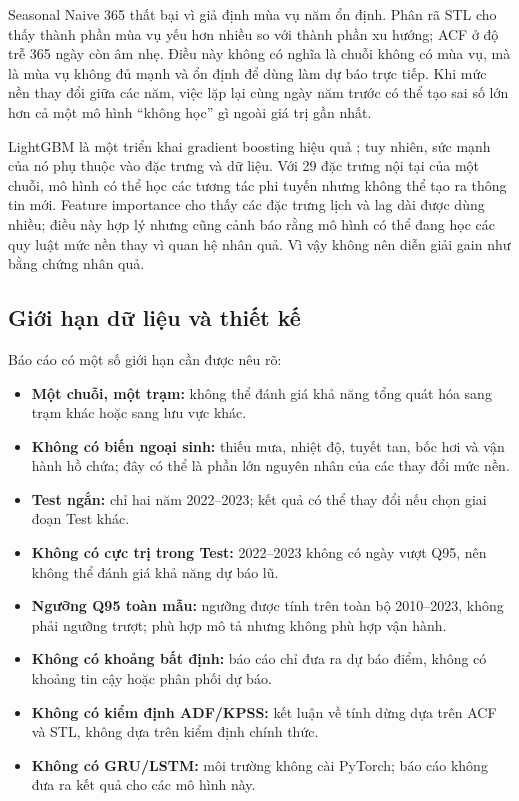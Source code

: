 Seasonal Naive 365 thất bại vì giả định mùa vụ năm ổn định. Phân rã STL cho thấy
thành phần mùa vụ yếu hơn nhiều so với thành phần xu hướng; ACF ở độ trễ 365 ngày
còn âm nhẹ. Điều này không có nghĩa là chuỗi không có mùa vụ, mà là mùa vụ không đủ
mạnh và ổn định để dùng làm dự báo trực tiếp. Khi mức nền thay đổi giữa các năm,
việc lặp lại cùng ngày năm trước có thể tạo sai số lớn hơn cả một mô hình “không
học” gì ngoài giá trị gần nhất.

LightGBM là một triển khai gradient boosting hiệu quả \cite{ke2017}; tuy nhiên, sức
mạnh của nó phụ thuộc vào đặc trưng và dữ liệu. Với 29 đặc trưng nội tại của một
chuỗi, mô hình có thể học các tương tác phi tuyến nhưng không thể tạo ra thông tin
mới. Feature importance cho thấy các đặc trưng lịch và lag dài được dùng nhiều; điều
này hợp lý nhưng cũng cảnh báo rằng mô hình có thể đang học các quy luật mức nền
thay vì quan hệ nhân quả. Vì vậy không nên diễn giải gain như bằng chứng nhân quả.

\subsection{Giới hạn dữ liệu và thiết kế}

Báo cáo có một số giới hạn cần được nêu rõ:

\begin{itemize}[leftmargin=1.4em]
  \item \textbf{Một chuỗi, một trạm:} không thể đánh giá khả năng tổng quát hóa sang
  trạm khác hoặc sang lưu vực khác.
  \item \textbf{Không có biến ngoại sinh:} thiếu mưa, nhiệt độ, tuyết tan, bốc hơi
  và vận hành hồ chứa; đây có thể là phần lớn nguyên nhân của các thay đổi mức nền.
  \item \textbf{Test ngắn:} chỉ hai năm 2022--2023; kết quả có thể thay đổi nếu chọn
  giai đoạn Test khác.
  \item \textbf{Không có cực trị trong Test:} 2022--2023 không có ngày vượt Q95, nên
  không thể đánh giá khả năng dự báo lũ.
  \item \textbf{Ngưỡng Q95 toàn mẫu:} ngưỡng được tính trên toàn bộ 2010--2023,
  không phải ngưỡng trượt; phù hợp mô tả nhưng không phù hợp vận hành.
  \item \textbf{Không có khoảng bất định:} báo cáo chỉ đưa ra dự báo điểm, không có
  khoảng tin cậy hoặc phân phối dự báo.
  \item \textbf{Không có kiểm định ADF/KPSS:} kết luận về tính dừng dựa trên ACF và
  STL, không dựa trên kiểm định chính thức.
  \item \textbf{Không có GRU/LSTM:} môi trường không cài PyTorch; báo cáo không đưa
  ra kết quả cho các mô hình này.
\end{itemize}

